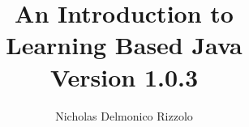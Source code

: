 \documentclass[11pt]{book}
\begin{document}
\title{
  \LARGE{An Introduction to}\\
  \Huge{Learning Based Java}\\
  \vspace{.3cm}
  \Large{Version 1.0.3}}
\author{Nicholas Delmonico Rizzolo}
\maketitle
\frontmatter
\tableofcontents
\mainmatter












\end{document}
